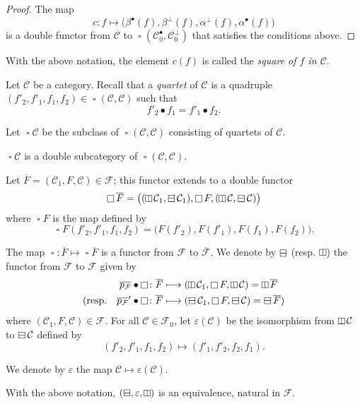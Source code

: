 \documentclass[a4paper,fleqn]{article}
\theoremstyle{plain}
\newenvironment{proposition}[1]
  {\renewcommand\theinnerproposition{#1}\innerproposition}
  {\endinnerproposition}
\theoremstyle{definition}
\newenvironment{definition}[1]
  {\renewcommand\theinnerdefinition{#1}\innerdefinition}
  {\endinnerdefinition}
\newcommand{\oldpage}[1]{{\marginpar{\footnotesize$\bigg\vert$\,\,\,\,\textit{p.~#1}}}}
\newcommand{\CC}{\mathcal{C}}
\newcommand{\FF}{\mathcal{F}}
\newcommand{\hsqbox}{{\boxminus}}
\newcommand{\vsqbox}{{\rotatebox{90}{$\boxminus$}}}
\DeclareMathOperator{\sq}{\square}
\DeclareMathOperator{\hsq}{\raisebox{-.05em}{$\hsqbox$}}
\DeclareMathOperator{\vsq}{\raisebox{-.1em}{$\vsqbox$}}
\newcommand{\smallbullet}{\bullet}
\begin{document}
\begin{proof}
  The map
  \[
    c\colon f
    \longmapsto \big(
      \beta^\smallbullet(f), \beta^\perp(f), \alpha^\perp(f), \alpha^\smallbullet(f)
    \big)
  \]
  is a double functor from $\CC$ to $\sq(\CC_0^\smallbullet,\CC_0^\perp)$ that satisfies the conditions above.
\end{proof}

\begin{definition}{14}
\label{definition:ii-14}
  With the above notation, the element $c(f)$ is called the \emph{square of $f$ in $\CC$}.
\end{definition}

Let $\CC$ be a category.
Recall \cite{3a} that a \emph{quartet} of $\CC$ is a quadruple $(f'_2,f'_1,f_1,f_2)\in\sq(\CC,\CC)$ such that
\[
  f'_2\smallbullet f_1
  = f'_1\smallbullet f_2.
\]

Let $\sq\CC$ be the subclass of $\sq(\CC,\CC)$ consisting of quartets of $\CC$.

\begin{proposition}{12}
\label{proposition:ii-12}
  $\sq\CC$ is a double subcategory of $\sq(\CC,\CC)$.
\end{proposition}

Let $\overline{F}=(\CC_1,F,\CC)\in\FF$;
this functor extends to a double functor
\[
  \sq\overline{F}
  = \big(
    (\vsq\CC_1,\hsq\CC_1), \sq F, (\vsq\CC,\hsq\CC)
  \big)
\]
where $\sq F$ is the map defined by
\[
  \sq F(f'_2,f'_1,f_1,f_2)
  = \big(
    F(f'_2), F(f'_1), F(f_1), F(f_2)
  \big).
\]

\oldpage{395}
The map $\sq\colon\overline{F}\mapsto\sq\overline{F}$ is a functor from $\FF$ to $\overline{\FF}$.
We denote by $\hsq$ (resp. $\vsq$) the functor from $\FF$ to $\FF$ given by
\[
  \begin{aligned}
    \overline{p_\FF}\smallbullet\sq
    &\colon \overline{F}
    \longmapsto (\vsq\CC_1,\sq F,\vsq\CC)
    = \vsq\overline{F}
  \\(\text{resp.}\quad \overline{p_\FF}'\smallbullet\sq
    &\colon \overline{F}
    \longmapsto (\hsq\CC_1,\sq F,\hsq\CC)
    = \hsq\overline{F})
  \end{aligned}
\]
where $(\CC_1,F,\CC)\in\FF$.
For all $\CC\in\FF_0$, let $\varepsilon(\CC)$ be the isomorphism from $\vsq\CC$ to $\hsq\CC$ defined by
\[
  (f'_2,f'_1,f_1,f_2)
  \longmapsto (f'_1,f'_2,f_2,f_1).
\]

We denote by $\varepsilon$ the map $\CC\mapsto\varepsilon(\CC)$.

\begin{proposition}{13}
\label{proposition:ii-13}
  With the above notation, $(\hsq,\varepsilon,\vsq)$ is an equivalence, natural in $\FF$.
\end{proposition}
\end{document}
